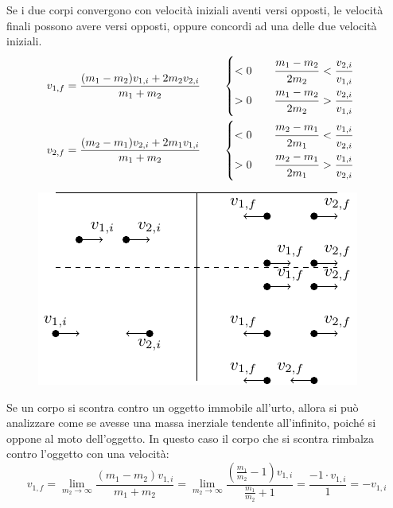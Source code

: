 \documentclass{article}
\numberwithin{equation}{subsection}
\begin{document}
Se i due corpi convergono con velocità iniziali aventi 
versi opposti, le velocità finali possono avere 
versi opposti, oppure concordi ad una delle due velocità iniziali.
\begin{gather*}
    \displaystyle v_{1,f}=\frac{(m_1-m_2)v_{1,i}+2m_2v_{2,i}}{m_1+m_2}\qquad
    \begin{cases}
        <0 \qquad\displaystyle\frac{\strut m_1-m_2}{\strut 2m_2}<\frac{\strut v_{2,i}}{\strut v_{1,i}}\\
        >0 \qquad\displaystyle\frac{\strut m_1-m_2}{\strut 2m_2}>\frac{\strut v_{2,i}}{\strut v_{1,i}}
    \end{cases}\\
    \displaystyle v_{2,f}=\frac{(m_2-m_1)v_{2,i}+2m_1v_{1,i}}{m_1+m_2}\qquad
    \begin{cases}
        <0 \qquad\displaystyle\frac{\strut m_2-m_1}{\strut 2m_1}<\frac{\strut v_{1,i}}{\strut v_{2,i}}\\
        >0 \qquad\displaystyle\frac{\strut m_2-m_1}{\strut 2m_1}>\frac{\strut v_{1,i}}{\strut v_{2,i}}
    \end{cases}
\end{gather*}


\begin{figure}[H]%
    \centering
    \includegraphics{urti.pdf}%
\end{figure}

Se un corpo si scontra contro un oggetto immobile all'urto, 
allora si può analizzare come se avesse una massa inerziale 
tendente all'infinito, poiché si oppone al moto dell'oggetto. 
In questo caso il corpo che si scontra rimbalza contro l'oggetto 
con una velocità: 
\begin{equation}
    v_{1,f}=\displaystyle\lim_{m_2\to\infty}\frac{(m_1-m_2)v_{1,i}}{m_1+m_2}=\lim_{m_2\to\infty}\frac{\left(\frac{m_1}{m_2}-1\right)v_{1,i}}{\frac{m_1}{m_2}+1}=\frac{-1\cdot v_{1,i}}{1}=-v_{1,i}
\end{equation}
\end{document}
